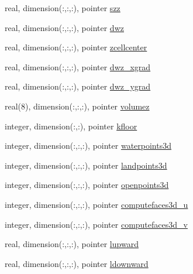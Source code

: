 \begin{DoxyCompactItemize}
real, dimension(\+:,\+:,\+:), pointer \mbox{\hyperlink{structmodulelagrangian_1_1t__externalvar_a1cc316f13041feac95d023f448c42754}{szz}}
\item 
real, dimension(\+:,\+:,\+:), pointer \mbox{\hyperlink{structmodulelagrangian_1_1t__externalvar_a209ad36fa53d556901aa48c8a6ce320a}{dwz}}
\item 
real, dimension(\+:,\+:,\+:), pointer \mbox{\hyperlink{structmodulelagrangian_1_1t__externalvar_acbee2d5d05aa2dcb10edcd2d58090c8a}{zcellcenter}}
\item 
real, dimension(\+:,\+:,\+:), pointer \mbox{\hyperlink{structmodulelagrangian_1_1t__externalvar_a1f507d1adc9d8d0e44fae702c64751f4}{dwz\+\_\+xgrad}}
\item 
real, dimension(\+:,\+:,\+:), pointer \mbox{\hyperlink{structmodulelagrangian_1_1t__externalvar_ac3328099b88e6ce5c1230a66531730a3}{dwz\+\_\+ygrad}}
\item 
real(8), dimension(\+:,\+:,\+:), pointer \mbox{\hyperlink{structmodulelagrangian_1_1t__externalvar_a8a3885b176b2a380d6dca915075bd586}{volumez}}
\item 
integer, dimension(\+:,\+:), pointer \mbox{\hyperlink{structmodulelagrangian_1_1t__externalvar_afa5b404ae4ef61b583699b738ca8931a}{kfloor}}
\item 
integer, dimension(\+:,\+:,\+:), pointer \mbox{\hyperlink{structmodulelagrangian_1_1t__externalvar_a39d1ec61430995f68ff1efa1b2c1c9b4}{waterpoints3d}}
\item 
integer, dimension(\+:,\+:,\+:), pointer \mbox{\hyperlink{structmodulelagrangian_1_1t__externalvar_a43e00f7d3f51d7d25f787e8497233eae}{landpoints3d}}
\item 
integer, dimension(\+:,\+:,\+:), pointer \mbox{\hyperlink{structmodulelagrangian_1_1t__externalvar_ac0e994d0fc2a34398848762291668c6a}{openpoints3d}}
\item 
integer, dimension(\+:,\+:,\+:), pointer \mbox{\hyperlink{structmodulelagrangian_1_1t__externalvar_ac416a7847db1012cbc2ef05561fe634c}{computefaces3d\+\_\+u}}
\item 
integer, dimension(\+:,\+:,\+:), pointer \mbox{\hyperlink{structmodulelagrangian_1_1t__externalvar_a229b7a152c3160766cff98be06c38f67}{computefaces3d\+\_\+v}}
\item 
real, dimension(\+:,\+:,\+:), pointer \mbox{\hyperlink{structmodulelagrangian_1_1t__externalvar_a3a8bde2d73d6c85e58734354884bb2bf}{lupward}}
\item 
real, dimension(\+:,\+:,\+:), pointer \mbox{\hyperlink{structmodulelagrangian_1_1t__externalvar_a029ec6eb90b45fe51d8950d1373e3361}{ldownward}}

\end{DoxyCompactItemize}
